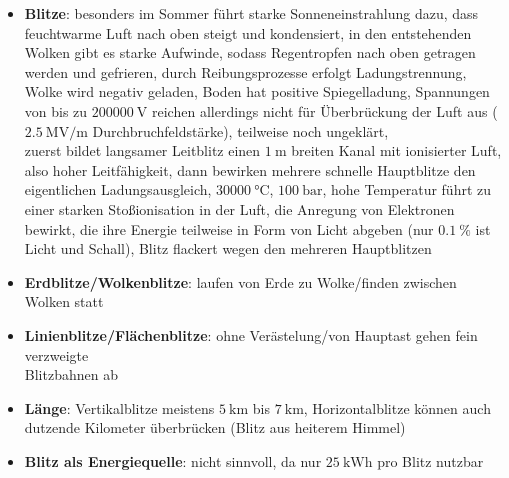 \pagebreak
\begin{itemize}
    \item
    \textbf{Blitze}:
    besonders im Sommer führt starke Sonneneinstrahlung dazu, dass
    feuchtwarme Luft nach oben steigt und kondensiert,
    in den entstehenden Wolken gibt es starke Aufwinde, sodass Regentropfen
    nach oben getragen werden und gefrieren, durch Reibungsprozesse erfolgt
    Ladungstrennung, Wolke wird negativ geladen, Boden hat positive
    Spiegelladung,
    Spannungen von bis zu $\SI{200000}{\volt}$ reichen allerdings nicht für
    Überbrückung der Luft aus ($\SI{2.5}{\mega\volt\per\meter}$
    Durchbruchfeldstärke),
    teilweise noch ungeklärt, \\
    zuerst bildet langsamer Leitblitz einen $\SI{1}{\meter}$ breiten Kanal
    mit ionisierter Luft, also hoher Leitfähigkeit, dann bewirken mehrere
    schnelle Hauptblitze den eigentlichen Ladungsausgleich,
    $\SI{30000}{\celsius}$, $\SI{100}{\bar}$,
    hohe Temperatur führt zu einer starken Stoßionisation in der Luft,
    die Anregung von Elektronen bewirkt, die ihre Energie teilweise in Form
    von Licht abgeben (nur $\SI{0.1}{\percent}$ ist Licht und Schall),
    Blitz flackert wegen den mehreren Hauptblitzen

    \item
    \textbf{Erdblitze/Wolkenblitze}:
    laufen von Erde zu Wolke/finden zwischen Wolken statt

    \item
    \textbf{Linienblitze/Flächenblitze}:
    ohne Verästelung/von Hauptast gehen fein verzweigte\\
    Blitzbahnen ab

    \item
    \textbf{Länge}:
    Vertikalblitze meistens $\SI{5}{\kilo\meter}$ bis $\SI{7}{\kilo\meter}$,
    Horizontalblitze können auch dutzende Kilometer überbrücken
    (Blitz aus heiterem Himmel)

    \item
    \textbf{Blitz als Energiequelle}:
    nicht sinnvoll, da nur $\SI{25}{\kilo\watt\hour}$ pro Blitz nutzbar
\end{itemize}
\linie
